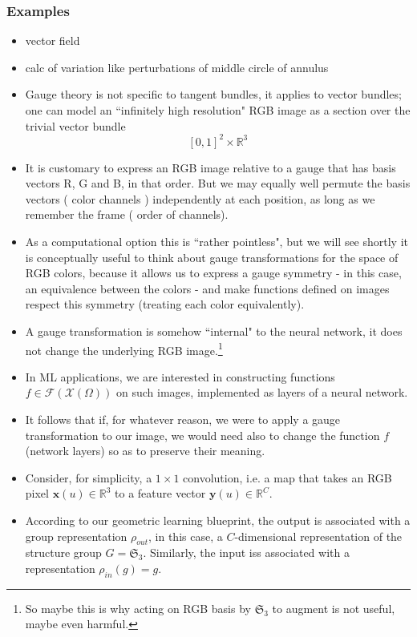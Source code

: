 \documentclass[12pt]{article}
\numberwithin{equation}{section}
\theoremstyle{definition}
\newcommand{		\Oh		}	{	\Omega					}
\newcommand{		\1		}	{	\bm{1}					}%
\begin{document}
\subsubsection*{Examples} 

\begin{itemize}
\item vector field
\item calc of variation like perturbations of middle circle of annulus
\end{itemize}

\begin{mdframed}
\begin{itemize}
\item Gauge theory is not specific to tangent bundles, it applies to vector bundles; one can model an ``infinitely high resolution" RGB image as a section over the trivial vector bundle
$$
[0,1]^2 \times \mathbb{R}^3 
$$
\item It is customary to express an RGB image relative to a gauge that has basis vectors R, G and B, in that order. But we may equally well permute the basis vectors ( color channels ) independently at each position, as long as we remember the frame ( order of channels).
\item As a computational option this is ``rather pointless", but we will see shortly it is conceptually useful to think about gauge transformations for the space of RGB colors, because it allows us to express a gauge symmetry - in this case, an equivalence between the colors - and make functions defined on images respect this symmetry (treating each color equivalently). 
\item A gauge transformation is somehow ``internal" to the neural network, it does not change the underlying RGB image.\footnote{ So maybe this is why acting on RGB basis by $\mathfrak{S}_3$ to augment is not useful, maybe even harmful. } 
\item In ML applications, we are interested in constructing functions $f \in \mathcal{F}(\mathcal{X}(\Oh))$ on such images, implemented as layers of a neural network. 
\item It follows that if, for whatever reason, we were to apply a gauge transformation to our image, we would need also to change the function $f$ (network layers) so as to preserve their meaning. 
\item Consider, for simplicity, a $1 \times 1$ convolution, i.e. a map that takes an RGB pixel $\mathbf{x}(u) \in \mathbb{R}^3$ to a feature vector $\mathbf{y}(u) \in \mathbb{R}^C$. 
\item According to our geometric learning blueprint, the output is associated with a group representation $\rho_{out}$, in this case, a $C$-dimensional representation of the structure group $G  =\mathfrak{S}_3$. Similarly, the input iss associated with a representation $\rho_{in}(g) = g$.

\end{itemize}
\end{mdframed}
\end{document}
